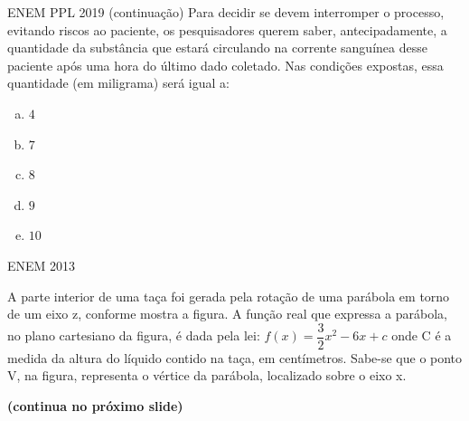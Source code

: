 \documentclass[11pt]{beamer}
\begin{document}
\begin{frame}{ENEM PPL 2019 (continuação)}
    Para decidir se devem interromper o processo, evitando riscos ao paciente, os pesquisadores querem saber, antecipadamente, a quantidade da substância que estará circulando na corrente sanguínea desse paciente após uma hora do último dado coletado. Nas condições expostas, essa quantidade (em miligrama) será igual a:

    \begin{enumerate}[a)]
        \item $4$
        \item $7$ %
        \item $8$ 
        \item $9$ 
        \item $10$ 
    \end{enumerate}
\end{frame}

\begin{frame}{ENEM 2013}
    
    A parte interior de uma taça foi gerada pela rotação de uma parábola em torno de um eixo z, conforme mostra a figura. A função real que expressa a parábola, no plano cartesiano da figura, é dada pela lei: $f(x)=\dfrac{3}{2}x^{2}-6x+c$ onde C é a medida da altura do líquido contido na taça, em centímetros. Sabe-se que o ponto V, na figura, representa o vértice da parábola, localizado sobre o eixo x. 

    \vfill
    \textbf{(continua no próximo slide)}
    
\end{frame}
\end{document}
